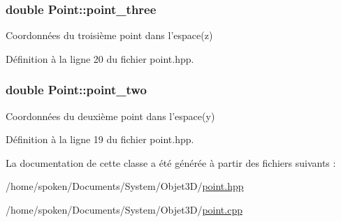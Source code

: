 \hypertarget{class_point_af7cb3c4c0c0f52218ac9ce180df003da}{
\subsubsection[{point\-\_\-three}]{\setlength{\rightskip}{0pt plus 5cm}double Point\-::point\-\_\-three\hspace{0.3cm}{\ttfamily [private]}}}\label{class_point_af7cb3c4c0c0f52218ac9ce180df003da}
Coordonnées du troisième point dans l'espace(z) 

Définition à la ligne 20 du fichier point.\-hpp.

\hypertarget{class_point_a7eece7f7413a741137cf32bb763f3987}{
\subsubsection[{point\-\_\-two}]{\setlength{\rightskip}{0pt plus 5cm}double Point\-::point\-\_\-two\hspace{0.3cm}{\ttfamily [private]}}}\label{class_point_a7eece7f7413a741137cf32bb763f3987}
Coordonnées du deuxième point dans l'espace(y) 

Définition à la ligne 19 du fichier point.\-hpp.



La documentation de cette classe a été générée à partir des fichiers suivants \-:\begin{DoxyCompactItemize}
\item 
/home/spoken/\-Documents/\-System/\-Objet3\-D/\hyperlink{point_8hpp}{point.\-hpp}\item 
/home/spoken/\-Documents/\-System/\-Objet3\-D/\hyperlink{point_8cpp}{point.\-cpp}\end{DoxyCompactItemize}
